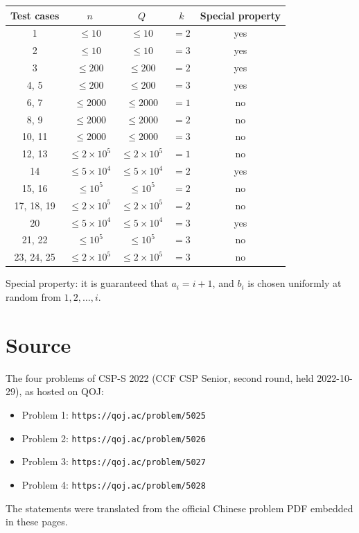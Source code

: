 \documentclass[11pt]{article}
\begin{document}
\begin{center}
\begin{tabular}{ccccc}
\toprule
Test cases & $n$ & $Q$ & $k$ & Special property \\
\midrule
1 & $\le 10$ & $\le 10$ & $= 2$ & yes \\
2 & $\le 10$ & $\le 10$ & $= 3$ & yes \\
3 & $\le 200$ & $\le 200$ & $= 2$ & yes \\
4, 5 & $\le 200$ & $\le 200$ & $= 3$ & yes \\
6, 7 & $\le 2000$ & $\le 2000$ & $= 1$ & no \\
8, 9 & $\le 2000$ & $\le 2000$ & $= 2$ & no \\
10, 11 & $\le 2000$ & $\le 2000$ & $= 3$ & no \\
12, 13 & $\le 2 \times 10^5$ & $\le 2 \times 10^5$ & $= 1$ & no \\
14 & $\le 5 \times 10^4$ & $\le 5 \times 10^4$ & $= 2$ & yes \\
15, 16 & $\le 10^5$ & $\le 10^5$ & $= 2$ & no \\
17, 18, 19 & $\le 2 \times 10^5$ & $\le 2 \times 10^5$ & $= 2$ & no \\
20 & $\le 5 \times 10^4$ & $\le 5 \times 10^4$ & $= 3$ & yes \\
21, 22 & $\le 10^5$ & $\le 10^5$ & $= 3$ & no \\
23, 24, 25 & $\le 2 \times 10^5$ & $\le 2 \times 10^5$ & $= 3$ & no \\
\bottomrule
\end{tabular}
\end{center}

Special property: it is guaranteed that $a_i = i + 1$,
and $b_i$ is chosen uniformly at random from $1, 2, \ldots, i$.

\section*{Source}

The four problems of CSP-S 2022 (CCF CSP Senior, second round,
held 2022-10-29), as hosted on QOJ:
\begin{itemize}
\item Problem 1: \texttt{https://qoj.ac/problem/5025}
\item Problem 2: \texttt{https://qoj.ac/problem/5026}
\item Problem 3: \texttt{https://qoj.ac/problem/5027}
\item Problem 4: \texttt{https://qoj.ac/problem/5028}
\end{itemize}
The statements were translated from the official Chinese problem PDF
embedded in these pages.
\end{document}
